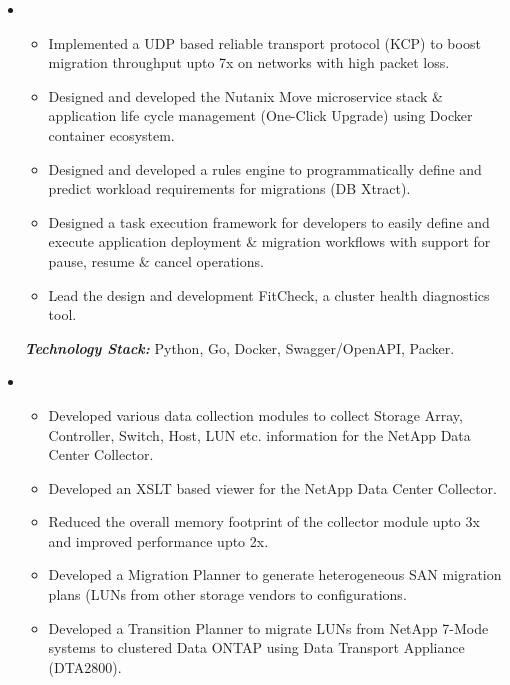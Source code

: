 \documentclass[11pt,a4paper,roman]{moderncv}        %
\begin{document}
\begin{itemize}

\item{

\begin{itemize}
\item Implemented a UDP based reliable transport protocol (KCP) to boost migration throughput upto 7x on networks with high packet loss. 
\item Designed and developed the Nutanix Move microservice stack \& application life cycle management (One-Click Upgrade) using Docker container ecosystem.
\item Designed and developed a rules engine to programmatically define and predict workload requirements for migrations (DB Xtract).
\item Designed a task execution framework for developers to easily define and execute application deployment \& migration workflows with support for pause, resume \& cancel operations.
\item Lead the design and development FitCheck, a cluster health diagnostics tool.
\end{itemize}

\vspace{5pt}

\textit{\textbf{Technology Stack:}} Python, Go, Docker, Swagger/OpenAPI, Packer.

}

\vspace{6pt}

\item{

\begin{itemize}
\item Developed various data collection modules to collect Storage Array, Controller, Switch, Host, LUN etc. information for the NetApp Data Center Collector.
\item Developed an XSLT based viewer for the NetApp Data Center Collector.
\item Reduced the overall memory footprint of the collector module upto 3x and improved performance upto 2x.
\item Developed a Migration Planner to generate heterogeneous SAN migration plans (LUNs from other storage vendors to configurations.
\item Developed a Transition Planner to migrate LUNs from NetApp 7-Mode systems to clustered Data ONTAP using Data Transport Appliance (DTA2800).
\end{itemize}

}
\end{itemize}
\end{document}
